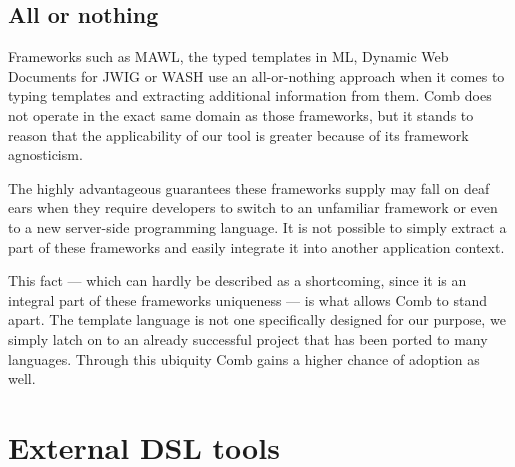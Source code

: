 \documentclass[thesis.tex]{subfiles}
\begin{document}
\subsection{All or nothing}
Frameworks such as MAWL, the typed templates in ML, Dynamic Web
Documents \cite{DYNDOC} for JWIG or WASH \cite{wash} use an all-or-nothing
approach when it comes to typing templates and extracting additional information
from them.
Comb does not operate in the exact same domain as those frameworks, but it
stands to reason that the applicability of our tool is greater because of its
framework agnosticism.

The highly advantageous guarantees these frameworks supply may fall on deaf ears
when they require developers to switch to an unfamiliar framework or even to
a new server-side programming language. It is not possible to simply extract a
part of these frameworks and easily integrate it into another application
context.

This fact --- which can hardly be described as a shortcoming, since it is an
integral part of these frameworks uniqueness --- is what allows Comb to stand
apart. The template language is not one specifically designed for our purpose,
we simply latch on to an already successful project that has been ported to many
languages. Through this ubiquity Comb gains a higher chance of adoption as well.


\section{External DSL tools}
\end{document}
